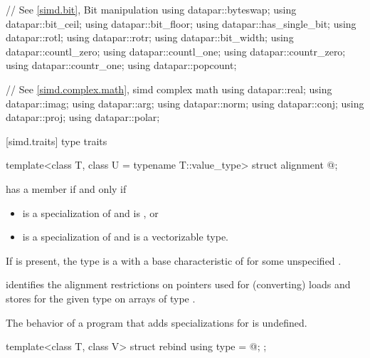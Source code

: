 \begin{codeblock}
{  // See \ref{simd.bit}, Bit manipulation
  using datapar::byteswap;
  using datapar::bit_ceil;
  using datapar::bit_floor;
  using datapar::has_single_bit;
  using datapar::rotl;
  using datapar::rotr;
  using datapar::bit_width;
  using datapar::countl_zero;
  using datapar::countl_one;
  using datapar::countr_zero;
  using datapar::countr_one;
  using datapar::popcount;

  // See \ref{simd.complex.math}, simd complex math
  using datapar::real;
  using datapar::imag;
  using datapar::arg;
  using datapar::norm;
  using datapar::conj;
  using datapar::proj;
  using datapar::polar;
}
\end{codeblock}

[simd.traits]{ type traits}

\begin{itemdecl}
template<class T, class U = typename T::value_type> struct alignment { @\seebelow@ };
\end{itemdecl}

\begin{itemdescr}
\pnum
{} has a member  if and only if
\begin{itemize}
 \item
    is a specialization of  and  is
   , or
 \item
    is a specialization of  and  is a
   vectorizable type.
\end{itemize}

\pnum
If  is present, the type  is a
 with a base characteristic of
 for some unspecified
.
\begin{note}
 identifies the alignment restrictions on pointers used for
(converting) loads and stores for the given type  on arrays of type
.
\end{note}

\pnum
The behavior of a program that adds specializations for 
is undefined.
\end{itemdescr}

\begin{itemdecl}
template<class T, class V> struct rebind { using type = @\seebelow@; };
\end{itemdecl}

